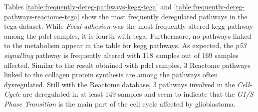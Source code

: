 Tables \ref*{table:frequently-dereg-pathways-kegg-tcga} and \ref*{table:frequently-dereg-pathways-reactome-tcga} show the most frequently deregulated pathways in the \acrshort{tcga} dataset.
While \textit{Focal adhesion} was the most frequently altered \acrshort{kegg} pathway among the \acrshort{pdcl} samples, it is fourth with \acrshort{tcga}.
Furthermore, no pathways linked to the metabolism appear in the table for \acrshort{kegg} pathways.
As expected, the \textit{p53 signalling} pathway is frequently altered with 118 samples out of 169 samples affected.
Similar to the result obtained with \acrshort{pdcl} samples, 3 Reactome pathways linked to the collagen protein synthesis are among the pathways often dysregulated.
Still with the Reactome database, 3 pathways involved in the \textit{Cell-Cycle} are deregulated in at least 149 samples and seem to indicate that the \textit{G1/S Phase Transition} is the main part of the cell cycle affected by glioblastoma.

